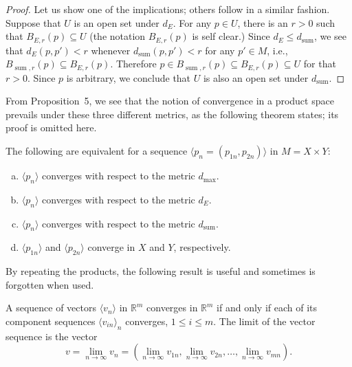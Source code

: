 \begin{proof}
  Let us show one of the implications; others follow in a similar fashion.
  Suppose that $U$ is an open set under $d_E$.
  For any $p \in U$, there is an $r > 0$ such that $B_{E,r}(p) \subseteq U$ (the notation $B_{E,r}(p)$ is self clear.)
  Since $d_E \leqslant d_{\operatorname{sum}}$, we see that $d_E(p,p') < r$ whenever $d_{\operatorname{sum}}(p,p') < r$ for any $p' \in M$, i.e., $B_{\operatorname{sum},r}(p) \subseteq B_{E,r}(p)$.
  Therefore $p \in B_{\operatorname{sum},r}(p) \subseteq B_{E,r}(p) \subseteq U$ for that $r > 0$.
  Since $p$ is arbitrary, we conclude that $U$ is also an open set under $d_{\operatorname{sum}}$.
\end{proof}

From Proposition~5, we see that the notion of convergence in a product space prevails under these three different metrics, as the following theorem states; its proof is omitted here.

\begin{thm}
  \label{thm:product-convergence}
  The following are equivalent for a sequence $\langle p_n = (p_{1n}, p_{2n}) \rangle$ in $M = X \times Y$:
  \begin{enumerate}[(a)]
    \item $\langle p_n \rangle$ converges with respect to the metric $d_{\operatorname{max}}$.
    \item $\langle p_n \rangle$ converges with respect to the metric $d_{E}$.
    \item $\langle p_n \rangle$ converges with respect to the metric $d_{\operatorname{sum}}$.
    \item $\langle p_{1n} \rangle$ and $\langle p_{2n} \rangle$ converge in $X$ and $Y$, respectively.
    
    
  \end{enumerate}
\end{thm}

By repeating the products, the following result is useful and sometimes is forgotten when used.

\begin{cor}
  A sequence of vectors $\langle v_n \rangle$ in $\mathbb{R}^m$ converges in $\mathbb{R}^m$ if and only if each of its component sequences $\langle v_{in} \rangle_n$ converges, $1 \leqslant i \leqslant m$.
  The limit of the vector sequence is the vector
  \[
    v = \lim_{n \to \infty} v_n = \left( \lim_{n \to \infty} v_{1n}, \lim_{n \to \infty} v_{2n}, \dots, \lim_{n \to \infty} v_{mn}  \right).
  \]
\end{cor}

